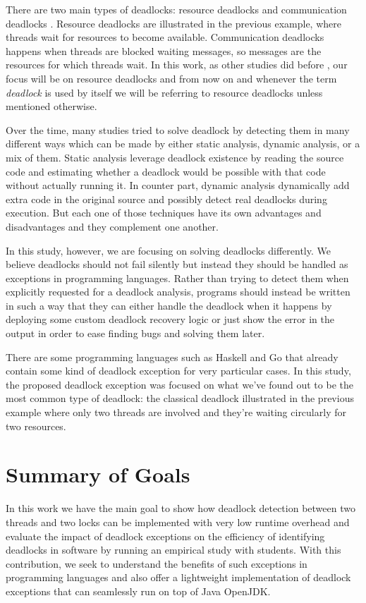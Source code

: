There are two main types of deadlocks: resource deadlocks and communication deadlocks \cite{singhal} \cite{knapp}. Resource deadlocks are illustrated in the previous
example, where threads wait for resources to become available. Communication deadlocks happens when threads are blocked waiting messages, so messages are the resources
for which threads wait. In this work, as other studies did before \cite{mcsdk} \cite{magicfuzzer}, our focus will be on resource deadlocks and from now on and whenever the term \emph{deadlock} is used by itself we will be referring to resource deadlocks unless mentioned otherwise.

Over the time, many studies tried to solve deadlock by detecting them in many different ways which can be made by either static analysis, dynamic analysis, or a mix of them. Static analysis leverage deadlock existence by reading the source code and estimating whether a deadlock would be possible with that code without actually running it. In counter part, dynamic analysis dynamically add extra code in the original source and possibly detect real deadlocks during execution. But each one of those techniques
have its own advantages and disadvantages and they complement one another.

In this study, however, we are focusing on solving deadlocks differently. We believe deadlocks should not fail silently but instead they should be handled as exceptions in programming languages. Rather than trying to detect them when explicitly requested for a deadlock analysis, programs should instead be written in such a way that they can either handle the deadlock when it happens by deploying some custom deadlock recovery logic or just show the error in the output in order to ease finding bugs and solving them later.

There are some programming languages such as Haskell and Go that already contain some kind of deadlock exception for very particular cases. In this study, the proposed deadlock exception was focused on what we've found out to be the most common type of deadlock: the classical deadlock illustrated in the previous example where only two threads are involved and they're waiting circularly for two resources.

\section{Summary of Goals}

In this work we have the main goal to show how deadlock detection between two threads and two locks can be implemented with very low runtime overhead and evaluate the impact of deadlock exceptions on the efficiency of identifying deadlocks in software by running an empirical study with students. With this contribution, we seek to understand the benefits of such exceptions in programming languages and also offer a lightweight implementation of deadlock exceptions that can seamlessly run on top of Java OpenJDK.

